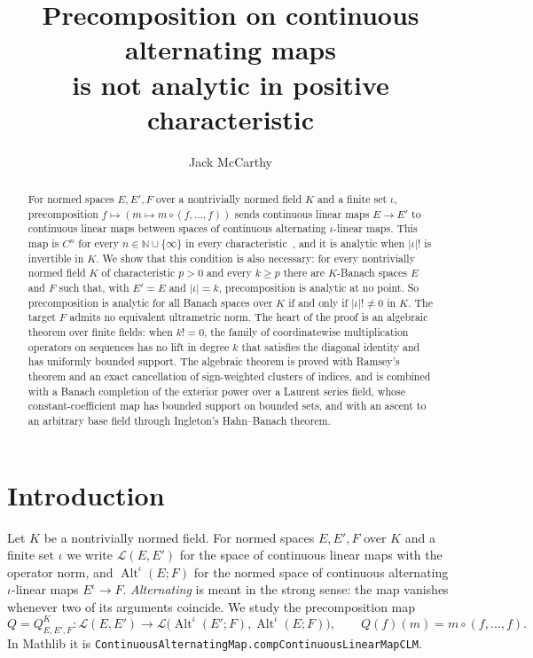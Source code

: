 \documentclass[11pt]{amsart}
\title[Alternating precomposition is not analytic in positive characteristic]{Precomposition on continuous alternating maps\\ is not analytic in positive characteristic}
\author{Jack McCarthy}
\theoremstyle{definition}
\theoremstyle{remark}
\numberwithin{equation}{section}
\newcommand{\N}{\mathbb{N}}
\newcommand{\cL}{\mathcal{L}}
\newcommand{\Alt}{\operatorname{Alt}}
\newcommand{\abs}[1]{\lvert #1\rvert}
\begin{document}
\begin{abstract}
For normed spaces $E,E',F$ over a nontrivially normed field $K$ and a finite set $\iota$, precomposition
$f\mapsto(m\mapsto m\circ(f,\dots,f))$ sends continuous linear maps $E\to E'$ to continuous linear maps between spaces
of continuous alternating $\iota$\nobreakdash-linear maps. This map is $C^n$ for every \mbox{$n\in\N\cup\{\infty\}$} in
every characteristic~\cite{PR}, and it is analytic when $\abs\iota!$ is invertible in $K$. We show that this condition is
also necessary: for every nontrivially normed field $K$ of characteristic $p>0$ and every $k\ge p$ there are
$K$\nobreakdash-Banach spaces $E$ and $F$ such that, with $E'=E$ and $\abs\iota=k$, precomposition is analytic at no point. So
precomposition is analytic for all Banach spaces over $K$ if and only if $\abs\iota!\neq0$ in $K$. The target $F$
admits no equivalent ultrametric norm. The heart of the proof is an algebraic theorem over finite fields: when $k!=0$, the
family of coordinatewise multiplication operators on sequences has no lift in degree $k$ that satisfies the diagonal
identity and has uniformly bounded support.
The algebraic theorem is proved with Ramsey's theorem and an exact cancellation of sign-weighted clusters of indices,
and is combined with a Banach completion of the exterior power over a Laurent series field, whose constant-coefficient map has bounded
support on bounded sets, and with an ascent to an arbitrary base field through Ingleton's Hahn--Banach theorem.
\end{abstract}
\maketitle

\section{Introduction}\label{sec:intro}
Let $K$ be a nontrivially normed field. For normed spaces $E,E',F$ over $K$ and a finite set $\iota$ we write
$\cL(E,E')$ for the space of continuous linear maps with the operator norm, and $\Alt^\iota(E;F)$ for the normed space
of continuous alternating $\iota$\nobreakdash-linear maps $E^\iota\to F$. \emph{Alternating} is meant in the strong sense: the map
vanishes whenever two of its arguments coincide. We study the precomposition map
\begin{equation}\label{eq:Q}
Q=Q^K_{E,E',F}\colon\cL(E,E')\to\cL\bigl(\Alt^\iota(E';F),\Alt^\iota(E;F)\bigr),\qquad Q(f)(m)=m\circ(f,\dots,f).
\end{equation}
In Mathlib it is \texttt{ContinuousAlternatingMap.\allowbreak{}compContinuousLinearMapCLM}.
\end{document}
